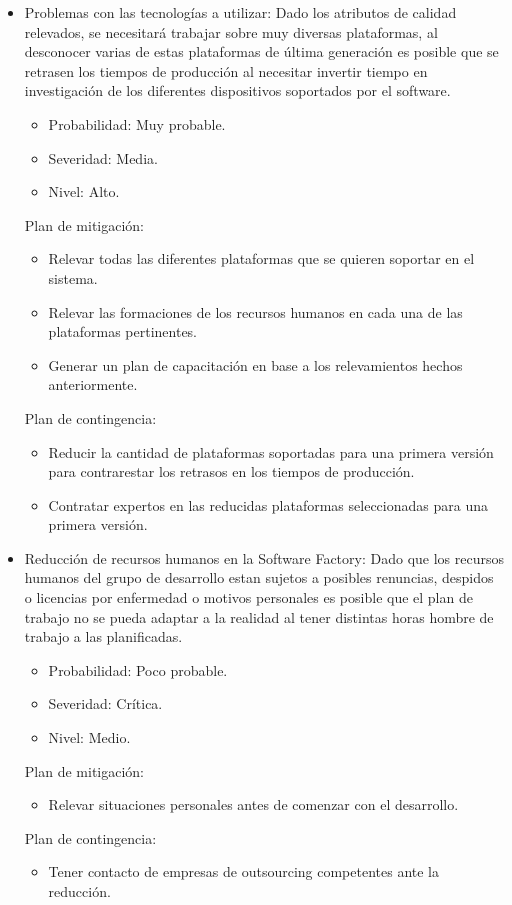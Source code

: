 \begin{itemize}
\item Problemas con las tecnolog\'ias a utilizar: Dado los atributos de calidad relevados, se necesitar\'a trabajar sobre muy diversas plataformas, al desconocer varias de estas plataformas de \'ultima generaci\'on es posible que se retrasen los tiempos de producci\'on al necesitar invertir tiempo en investigaci\'on de los diferentes dispositivos soportados por el software. 
\begin{itemize}
\item Probabilidad: Muy probable.
\item Severidad: Media.
\item Nivel: Alto.
\end{itemize}
\medskip
Plan de mitigación:
\begin{itemize}
\item Relevar todas las diferentes plataformas que se quieren soportar en el sistema.
\item Relevar las formaciones de los recursos humanos en cada una de las plataformas pertinentes.
\item Generar un plan de capacitaci\'on en base a los relevamientos hechos anteriormente.
\end{itemize}
\medskip
Plan de contingencia:
\begin{itemize}
\item Reducir la cantidad de plataformas soportadas para una primera versión para contrarestar los retrasos en los tiempos de producción.
\item Contratar expertos en las reducidas plataformas seleccionadas para una primera versión.
\end{itemize}



\bigskip

\item Reducci\'on de recursos humanos en la Software Factory: Dado que los recursos humanos del grupo de desarrollo estan sujetos a posibles renuncias, despidos o licencias por enfermedad o motivos personales es posible que el plan de trabajo no se pueda adaptar a la realidad al tener distintas horas hombre de trabajo a las planificadas.
\begin{itemize}
\item Probabilidad: Poco probable.
\item Severidad: Cr\'itica.
\item Nivel: Medio.
\end{itemize}
\medskip
Plan de mitigación:
\begin{itemize}
\item Relevar situaciones personales antes de comenzar con el desarrollo.
\end{itemize}
\medskip
Plan de contingencia:
\begin{itemize}
\item Tener contacto de empresas de outsourcing competentes ante la reducci\'on.
\end{itemize}





\end{itemize}
